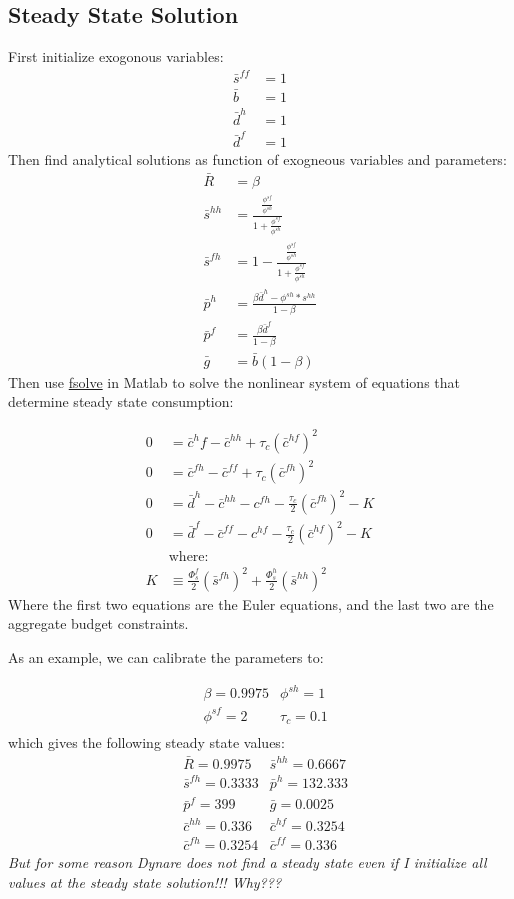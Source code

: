 \documentclass[a4paper]{article}
\begin{document}
\subsection{Steady State Solution}
First initialize exogonous variables:
\begin{align*}
\bar s^{ff}&=1\\
\bar b &= 1\\
\bar d^h &= 1\\
\bar d^f &=1
\end{align*}
Then find analytical solutions as function of exogneous variables and parameters:
\begin{align*}
\bar R&=\beta \\
\bar s^{hh} &= \frac{\frac{\phi^{sf}}{\phi^{sh}}}{1+\frac{\phi^{sf}}{\phi^{sh}}}\\
\bar s^{fh} &= 1 -\frac{\frac{\phi^{sf}}{\phi^{sh}}}{1+\frac{\phi^{sf}}{\phi^{sh}}}\\
\bar p^h &= \frac{\beta  \bar d^h -\phi^{sh}*s^{hh}}{1-\beta}\\
\bar p^f &= \frac{\beta \bar d^f}{1-\beta}\\
\bar g&=\bar b(1-\beta)
\end{align*}
Then use \url{fsolve} in Matlab to solve the nonlinear system of equations that determine steady state consumption:

\begin{align*}
0 &= \bar c^hf{} -\bar c^{hh} + \tau_c (\bar c^{hf})^2\\
0 &= \bar c^{fh} -\bar c^{ff} + \tau_c (\bar c^{fh})^2\\
0 &=\bar d^h -\bar c^{hh} - c^{fh} - \frac{\tau_c}{2} (\bar c^{fh})^2 - K\\
0 &=\bar d^f -\bar c^{ff} - c^{hf} - \frac{\tau_c}{2} (\bar c^{hf})^2 - K\\
& \text{where:} \\  
K &\equiv \frac{\Phi^f_s}{2}(\bar s^{fh})^2 + \frac{\Phi^h_s}{2}(\bar s^{hh})^2
\end{align*}
Where the first two equations are the Euler equations, and the last two are the aggregate budget constraints. 

As an example, we can calibrate the parameters to:

\begin{align*}
& \beta = 0.9975
& \phi^{sh} = 1 \\
& \phi^{sf} = 2 
& \tau_c = 0.1\\
\end{align*}
which gives the following steady state values:
\begin{align*}
& \bar R=0.9975
& \bar s^{hh} = 0.6667 \\
& \bar s^{fh}= 0.3333
& \bar p^h = 132.333\\
& \bar p^f = 399
& \bar g = 0.0025 \\
& \bar c^{hh}= 0.336
& \bar c^{hf} = 0.3254\\
& \bar c^{fh} = 0.3254
& \bar c^{ff} = 0.336
\end{align*}
\emph{But for some reason Dynare does not find a steady state even if I initialize all values at the steady state solution!!! Why???}
\end{document}
